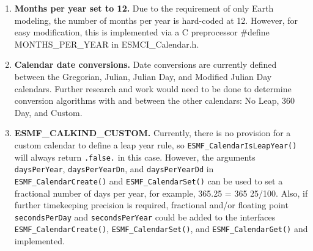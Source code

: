 
\label{subsec:Calendar_rest}

\begin{enumerate}

\item {\bf Months per year set to 12.} Due to the requirement of only Earth modeling, the number of months per year is hard-coded at 12.  However, for easy modification, this is implemented via a C preprocessor \#define MONTHS\_PER\_YEAR in ESMCI\_Calendar.h.

\item {\bf Calendar date conversions.} Date conversions are currently defined between the Gregorian, Julian, Julian Day, and Modified Julian Day calendars. Further research and work would need to be done to determine conversion algorithms with and between the other calendars:  No Leap, 360 Day, and Custom.

\item {\bf ESMF\_CALKIND\_CUSTOM.} Currently, there is no provision for a custom calendar to define a leap year rule, so {\tt ESMF\_CalendarIsLeapYear()} will always return {\tt .false.} in this case.  However, the arguments {\tt daysPerYear}, {\tt daysPerYearDn}, and {\tt daysPerYearDd} in {\tt ESMF\_CalendarCreate()} and {\tt ESMF\_CalendarSet()} can be used to set a fractional number of days per year, for example, 365.25 = 365 25/100.  Also, if further timekeeping precision is required, fractional and/or floating point {\tt secondsPerDay} and {\tt secondsPerYear} could be added to the interfaces {\tt ESMF\_CalendarCreate()}, {\tt ESMF\_CalendarSet()}, and {\tt ESMF\_CalendarGet()} and implemented.

\end{enumerate}
